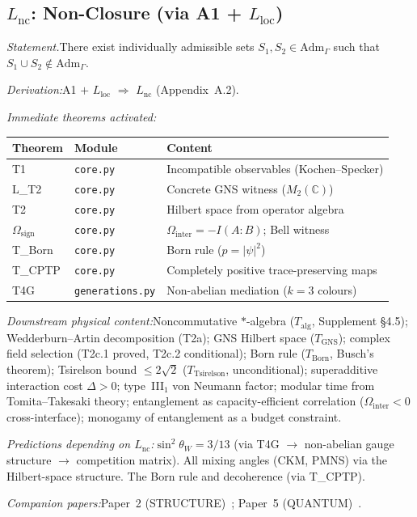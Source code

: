 \documentclass[11pt]{article}
\newcommand{\Adm}{\mathrm{Adm}}
\newcommand{\sw}{\sin^2\!\theta_W}
\newcommand{\Lnc}{L_{\mathrm{nc}}}
\newcommand{\Lloc}{L_{\mathrm{loc}}}
\begin{document}
\subsection{\texorpdfstring{$L_{\mathrm{nc}}$}{Lnc}: Non-Closure (via A1 + \texorpdfstring{$L_{\mathrm{loc}}$}{Lloc})}

\begin{tcolorbox}[apfbox, title={$\Lnc$ $\longrightarrow$ Quantum Mechanics}]
\textit{Statement.}\quad There exist individually admissible sets $S_1, S_2 \in \Adm_\Gamma$ such that $S_1 \cup S_2 \notin \Adm_\Gamma$.

\textit{Derivation:}\quad A1 $+$ $\Lloc$ $\Rightarrow$ $\Lnc$ (Appendix~A.2).

\smallskip\noindent\textit{Immediate theorems activated:}
\begin{center}
\small
\renewcommand{\arraystretch}{1.15}
\begin{tabular}{lll}
\toprule
\textbf{Theorem} & \textbf{Module} & \textbf{Content} \\
\midrule
T1 & \texttt{core.py} & Incompatible observables (Kochen--Specker) \\
L\_T2 & \texttt{core.py} & Concrete GNS witness ($M_2(\mathbb{C})$) \\
T2 & \texttt{core.py} & Hilbert space from operator algebra \\
$\Omega_{\mathrm{sign}}$ & \texttt{core.py} & $\Omega_{\mathrm{inter}} = -I(A{:}B)$; Bell witness \\
T\_Born & \texttt{core.py} & Born rule ($p = |\psi|^2$) \\
T\_CPTP & \texttt{core.py} & Completely positive trace-preserving maps \\
T4G & \texttt{generations.py} & Non-abelian mediation ($k = 3$ colours) \\
\bottomrule
\end{tabular}
\end{center}

\smallskip\noindent\textit{Downstream physical content:}\quad Noncommutative $*$-algebra ($T_{\mathrm{alg}}$, Supplement §4.5); Wedderburn--Artin decomposition (T2a); GNS Hilbert space ($T_{\mathrm{GNS}}$); complex field selection (T2c.1 proved, T2c.2 conditional); Born rule ($T_{\mathrm{Born}}$, Busch's theorem); Tsirelson bound $\le 2\sqrt{2}$ ($T_{\mathrm{Tsirelson}}$, unconditional); superadditive interaction cost $\Delta > 0$; type~III${}_1$ von Neumann factor; modular time from Tomita--Takesaki theory; entanglement as capacity-efficient correlation ($\Omega_{\mathrm{inter}} < 0$ cross-interface); monogamy of entanglement as a budget constraint.

\smallskip\noindent\textit{Predictions depending on $\Lnc$:}\quad $\sw = 3/13$ (via T4G $\to$ non-abelian gauge structure $\to$ competition matrix).  All mixing angles (CKM, PMNS) via the Hilbert-space structure.  The Born rule and decoherence (via T\_CPTP).

\smallskip\noindent\textit{Companion papers:}\quad Paper~2 (STRUCTURE)~\cite{P2}; Paper~5 (QUANTUM)~\cite{P5}.
\end{tcolorbox}
\end{document}
